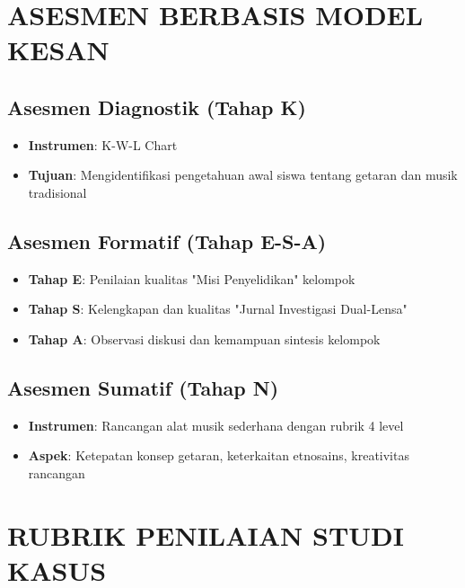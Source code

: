 \documentclass[12pt,a4paper]{article}
\begin{document}
\section{ASESMEN BERBASIS MODEL KESAN}

\subsection{Asesmen Diagnostik (Tahap K)}
\begin{itemize}
\item \textbf{Instrumen}: K-W-L Chart
\item \textbf{Tujuan}: Mengidentifikasi pengetahuan awal siswa tentang getaran dan musik tradisional
\end{itemize}

\subsection{Asesmen Formatif (Tahap E-S-A)}
\begin{itemize}
\item \textbf{Tahap E}: Penilaian kualitas "Misi Penyelidikan" kelompok
\item \textbf{Tahap S}: Kelengkapan dan kualitas "Jurnal Investigasi Dual-Lensa"
\item \textbf{Tahap A}: Observasi diskusi dan kemampuan sintesis kelompok
\end{itemize}

\subsection{Asesmen Sumatif (Tahap N)}
\begin{itemize}
\item \textbf{Instrumen}: Rancangan alat musik sederhana dengan rubrik 4 level
\item \textbf{Aspek}: Ketepatan konsep getaran, keterkaitan etnosains, kreativitas rancangan
\end{itemize}

\section{RUBRIK PENILAIAN STUDI KASUS}
\end{document}
